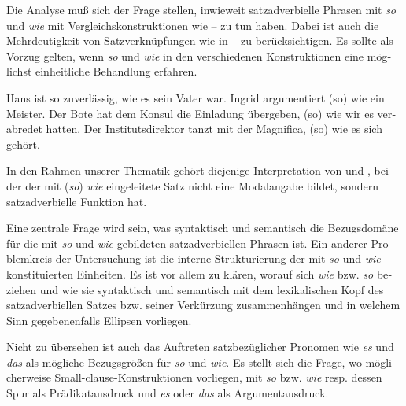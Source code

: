 \documentclass[output=paper, colorlinks, citecolor=brown, booklanguage=german]{langscibook}
\begin{document}
\begin{otherlanguage}{german}
Die Analyse muß sich der Frage stellen, inwieweit satzadverbielle Phrasen mit \textit{so} und \textit{wie} mit Vergleichskonstruktionen wie -- zu tun haben. Dabei ist auch die Mehrdeutigkeit von Satzverknüpfungen wie in -- zu berücksichtigen. Es sollte als Vorzug gelten, wenn \textit{so} und \textit{wie} in den verschiedenen Konstruktionen eine möglichst einheitliche Behandlung erfahren.

\ea \label{ex:zi97:9} Hans ist so zuverlässig, wie es sein Vater war.
\ex \label{ex:zi97:10} Ingrid argumentiert (so) wie ein Meister.
\ex \label{ex:zi97:11} Der Bote hat dem Konsul die Einladung übergeben, (so) wie wir es verabredet hatten.
\ex \label{ex:zi97:12} Der Institutsdirektor tanzt mit der Magnifica, (so) wie es sich gehört.
\z

\noindent In den Rahmen unserer Thematik gehört diejenige Interpretation von  und , bei der der mit (\textit{so}) \textit{wie} eingeleitete Satz nicht eine Modalangabe bildet, sondern satzadverbielle Funktion hat.

Eine zentrale Frage wird sein, was syntaktisch und semantisch die Bezugsdomäne für die mit \textit{so} und \textit{wie} gebildeten satzadverbiellen Phrasen ist. Ein anderer Problemkreis der Untersuchung ist die interne Strukturierung der mit \textit{so} und \textit{wie} konstituierten Einheiten. Es ist vor allem zu klären, worauf sich \textit{wie} bzw. \textit{so} beziehen und wie sie syntaktisch und semantisch mit dem lexikalischen Kopf des satzadverbiellen Satzes bzw. seiner Verkürzung zusammenhängen und in welchem Sinn gegebenenfalls Ellipsen vorliegen.

Nicht zu übersehen ist auch das Auftreten satzbezüglicher Pronomen wie \textit{es} und \textit{das} als mögliche Bezugsgrößen für \textit{so} und \textit{wie}. Es stellt sich die Frage, wo möglicherweise Small-clause-Konstruktionen vorliegen, mit \textit{so} bzw. \textit{wie} resp. dessen Spur als Prädikatausdruck und \textit{es} oder \textit{das} als Argumentausdruck.


\end{otherlanguage}
\end{document}
